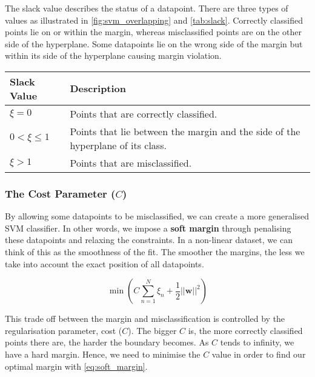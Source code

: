 The slack value describes the status of a datapoint. There are three types of values as illustrated in \autoref{fig:svm_overlapping} and \autoref{tab:slack}. Correctly classified points lie on or within the margin, whereas misclassified points are on the other side of the hyperplane. Some datapoints lie on the wrong side of the margin but within its side of the hyperplane causing margin violation.

\parbox{\linewidth} {
	\centering
  \begin{tabularx}{\textwidth}{|l|X|}
    \hline
    \textbf{Slack Value}	& \textbf{Description}
    \\ \hline
    $\xi = 0$ 					  & Points that are correctly classified.
    \\ \hline
    $0 < \xi \leq 1$     	& Points that lie between the margin and the side of the hyperplane of its class.
		\\ \hline
    $\xi > 1$  						& Points that are misclassified.
    \\ \hline

  \end{tabularx}
	\label{tab:slack}
}

\subsubsection{The Cost Parameter ($C$)}
By allowing some datapoints to be misclassified, we can create a more generalised SVM classifier. In other words, we impose a \textbf{soft margin} through penalising these datapoints and relaxing the constraints. In a non-linear dataset, we can think of this as the smoothness of the fit. The smoother the margins, the less we take into account the exact position of all datapoints. 

\begin{equation} \label{eq:soft_margin}
	\min \left ( C \sum_{n=1}^{N} \xi_{n} + \frac{1}{2}||\mathbf{w}||^2 \right )
\end{equation}

This trade off between the margin and misclassification is controlled by the regularisation parameter, cost ($C$). The bigger $C$ is, the more correctly classified points there are, the harder the boundary becomes. As $C$ tends to infinity, we have a hard margin. Hence, we need to minimise the $C$ value in order to find our optimal margin with \autoref{eq:soft_margin}.

